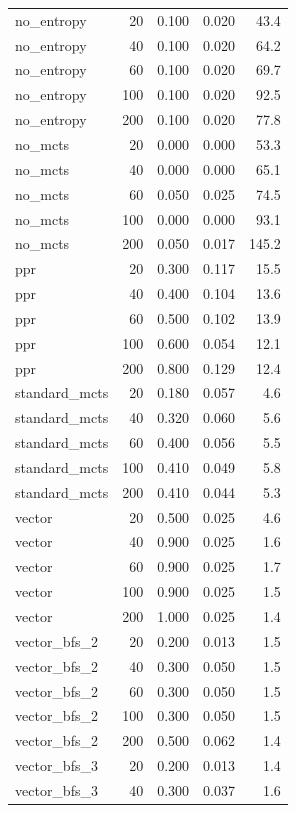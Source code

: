 \begin{tabular}{lrrrr}
no\_entropy & 20 & 0.100 & 0.020 & 43.4 \\
no\_entropy & 40 & 0.100 & 0.020 & 64.2 \\
no\_entropy & 60 & 0.100 & 0.020 & 69.7 \\
no\_entropy & 100 & 0.100 & 0.020 & 92.5 \\
no\_entropy & 200 & 0.100 & 0.020 & 77.8 \\
no\_mcts & 20 & 0.000 & 0.000 & 53.3 \\
no\_mcts & 40 & 0.000 & 0.000 & 65.1 \\
no\_mcts & 60 & 0.050 & 0.025 & 74.5 \\
no\_mcts & 100 & 0.000 & 0.000 & 93.1 \\
no\_mcts & 200 & 0.050 & 0.017 & 145.2 \\
ppr & 20 & 0.300 & 0.117 & 15.5 \\
ppr & 40 & 0.400 & 0.104 & 13.6 \\
ppr & 60 & 0.500 & 0.102 & 13.9 \\
ppr & 100 & 0.600 & 0.054 & 12.1 \\
ppr & 200 & 0.800 & 0.129 & 12.4 \\
standard\_mcts & 20 & 0.180 & 0.057 & 4.6 \\
standard\_mcts & 40 & 0.320 & 0.060 & 5.6 \\
standard\_mcts & 60 & 0.400 & 0.056 & 5.5 \\
standard\_mcts & 100 & 0.410 & 0.049 & 5.8 \\
standard\_mcts & 200 & 0.410 & 0.044 & 5.3 \\
vector & 20 & 0.500 & 0.025 & 4.6 \\
vector & 40 & 0.900 & 0.025 & 1.6 \\
vector & 60 & 0.900 & 0.025 & 1.7 \\
vector & 100 & 0.900 & 0.025 & 1.5 \\
vector & 200 & 1.000 & 0.025 & 1.4 \\
vector\_bfs\_2 & 20 & 0.200 & 0.013 & 1.5 \\
vector\_bfs\_2 & 40 & 0.300 & 0.050 & 1.5 \\
vector\_bfs\_2 & 60 & 0.300 & 0.050 & 1.5 \\
vector\_bfs\_2 & 100 & 0.300 & 0.050 & 1.5 \\
vector\_bfs\_2 & 200 & 0.500 & 0.062 & 1.4 \\
vector\_bfs\_3 & 20 & 0.200 & 0.013 & 1.4 \\
vector\_bfs\_3 & 40 & 0.300 & 0.037 & 1.6 \\

\end{tabular}
